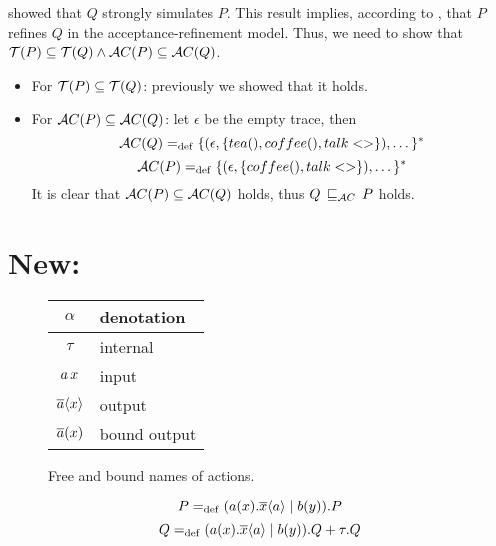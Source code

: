   showed that $Q$ strongly simulates $P$. This result implies, according to , that $P$ refines $Q$ in the acceptance-refinement model. Thus, we need to show that $\Traces[P]\subseteq\Traces[Q] \wedge \Accepatances[P]\subseteq\Accepatances[Q]$.
 
 \begin{itemize}
\item For $\Traces[P]\subseteq\Traces[Q]$: previously we showed that it holds. 

\item For $\Accepatances[P]\subseteq\Accepatances[Q]$: let $\epsilon$ be the empty trace, then
    \[\Accepatances[Q] \define \{(\epsilon,\{tea(),coffee(),talk<>\}),\dots\}^\ast\]
    \[\Accepatances[P] \define \{(\epsilon,\{coffee(),talk<>\}),\dots\}^\ast\]
It is clear that $\Accepatances[P]\subseteq\Accepatances[Q]$ holds, thus $Q \refiAC P$ holds.
\end{itemize}

\section{ New:}
\begin{figure}[!h]
\centering
\begin{tabular}{c|l}
$\alpha$      & denotation \\\hline
$\tau$        & internal \\
$a\,x$  & input  \\
$\overline{a}\langle x\rangle$  & output        \\
$\overline{a}(x)$ & bound output
\end{tabular}
\caption{Free and bound names of actions.}
\label{fig_names_act}
\end{figure}

\[P=_{\mathrm{def}}(a(x).\overline{x}\langle a\rangle \mid b(y)).P\]
\[Q=_{\mathrm{def}}(a(x).\overline{x}\langle a\rangle \mid b(y)).Q + \tau.Q\]